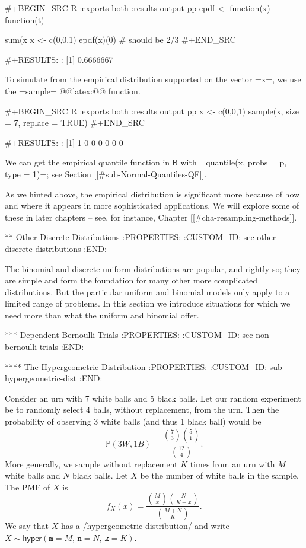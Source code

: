 #+BEGIN_SRC R :exports both :results output pp  
epdf <- function(x) function(t){sum(x %
x <- c(0,0,1)
epdf(x)(0)       # should be 2/3
#+END_SRC

#+RESULTS:
: [1] 0.6666667

To simulate from the empirical distribution supported on the vector
=x=, we use the =sample= @@latex:@@ function.

#+BEGIN_SRC R :exports both :results output pp  
x <- c(0,0,1)
sample(x, size = 7, replace = TRUE)
#+END_SRC

#+RESULTS:
: [1] 1 0 0 0 0 0 0

We can get the empirical quantile function in \(\mathsf{R}\) with
=quantile(x, probs = p, type = 1)=; see Section [[#sub-Normal-Quantiles-QF]].

As we hinted above, the empirical distribution is significant more
because of how and where it appears in more sophisticated
applications. We will explore some of these in later chapters -- see,
for instance, Chapter [[#cha-resampling-methods]].

** Other Discrete Distributions
:PROPERTIES:
:CUSTOM_ID: sec-other-discrete-distributions
:END:

The binomial and discrete uniform distributions are popular, and
rightly so; they are simple and form the foundation for many other
more complicated distributions. But the particular uniform and
binomial models only apply to a limited range of problems. In this
section we introduce situations for which we need more than what the
uniform and binomial offer.

*** Dependent Bernoulli Trials
:PROPERTIES:
:CUSTOM_ID: sec-non-bernoulli-trials
:END:

**** The Hypergeometric Distribution
:PROPERTIES:
:CUSTOM_ID: sub-hypergeometric-dist
:END:

Consider an urn with 7 white balls and 5 black balls. Let our random
experiment be to randomly select 4 balls, without replacement, from
the urn. Then the probability of observing 3 white balls (and thus 1
black ball) would be
\begin{equation}
\mathbb{P}(3W,1B)=\frac{{7 \choose 3}{5 \choose 1}}{{12 \choose 4}}.
\end{equation}
More generally, we sample without replacement \(K\) times from an urn
with \(M\) white balls and \(N\) black balls. Let \(X\) be the number
of white balls in the sample. The PMF of \(X\) is
\begin{equation}
f_{X}(x)=\frac{{M \choose x}{N \choose K-x}}{{M+N \choose K}}.
\end{equation}
We say that \(X\) has a /hypergeometric distribution/ and write
\(X\sim\mathsf{hyper}(\mathtt{m}=M,\,\mathtt{n}=N,\,\mathtt{k}=K)\).

}
